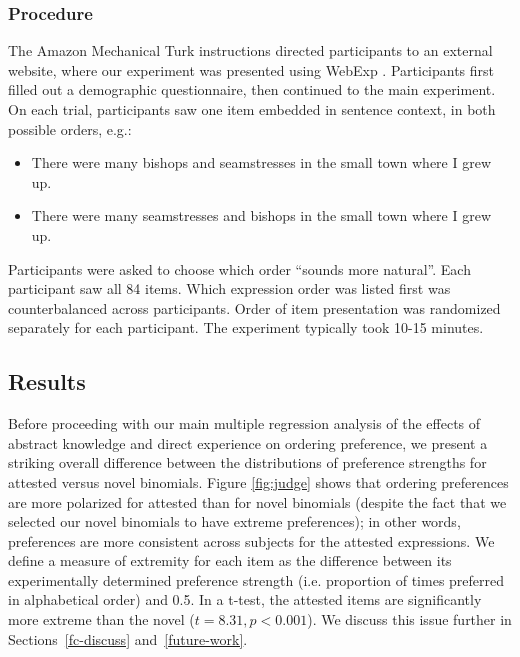 \documentclass[authoryear]{elsarticle}
\begin{document}
\subsubsection{Procedure}
The Amazon Mechanical Turk instructions directed participants to an external website, where our experiment was presented using WebExp \citep{Keller:2009wn}. Participants first filled out a demographic questionnaire, then continued to the main experiment. On each trial, participants saw one item embedded in sentence context, in both possible orders, e.g.:
\begin{itemize}
\item There were many bishops and seamstresses in the small town where I grew up.
\item There were many seamstresses and bishops in the small town where I grew up.
\end{itemize}
Participants were asked to choose which order ``sounds more natural''. Each participant saw all 84 items. Which expression order was listed first was counterbalanced across participants. Order of item presentation was randomized separately for each participant. The experiment typically took 10-15 minutes.

\subsection{Results}
Before proceeding with our main multiple regression analysis of the effects of abstract knowledge and direct experience on ordering preference, we present a striking overall difference between the distributions of preference strengths for attested versus novel binomials. Figure \ref{fig:judge} shows that ordering preferences are more polarized for attested than for novel binomials (despite the fact that we selected our novel binomials to have extreme preferences); in other words, preferences are more consistent across subjects for the attested expressions. We define a measure of extremity for each item as the difference between its experimentally determined preference strength (i.e. proportion of times preferred in alphabetical order) and 0.5. In a t-test, the attested items are significantly more extreme than the novel ($t=8.31, p < 0.001$). We discuss this issue further in Sections~\ref{fc-discuss} and~\ref{future-work}.
\end{document}
